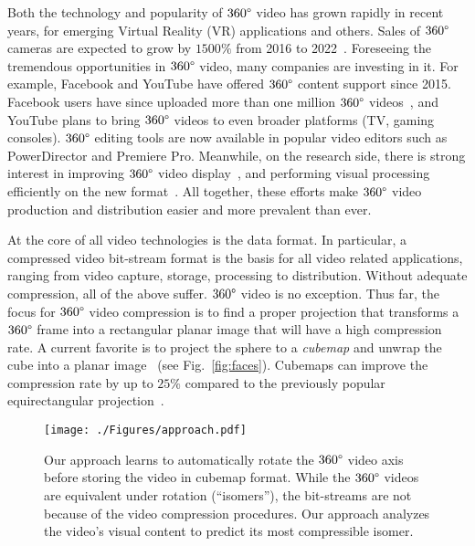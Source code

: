 \documentclass[journal,transmag]{IEEEtran}
\begin{document}
Both the technology and popularity of
$360\degree$ video has grown rapidly in recent years, for emerging Virtual Reality (VR) applications and others.
Sales of $360\degree$ cameras are expected to grow by $1500\%$ from 2016 to 2022~\cite{360camera}.
Foreseeing the tremendous opportunities in $360\degree$ video,
many companies are investing in it.  
For example, Facebook and YouTube have offered $360\degree$ content support since 2015.
Facebook users have since uploaded more than one million $360\degree$ videos~\cite{fb360videostatistics},
and YouTube plans to bring $360\degree$ videos to even broader platforms (TV, gaming consoles).
$360\degree$ editing tools are now available in popular video editors such as PowerDirector and Premiere Pro.
Meanwhile, on the research side, there is strong interest in improving $360\degree$ video display~\cite{kasahara2015first,kopf2016tog,kamali2011stabilizing,su2016accv,su2017cvpr,hu2017deep,lai2017semantic},
and performing visual processing efficiently on the new format~\cite{khasanova2017graph,cohen2017convolutional,su2017nips}.
All together, these efforts make $360\degree$ video production and distribution easier and more prevalent than ever.

At the core of all video technologies is the data format.
In particular, a compressed video bit-stream format is the basis for all video related applications,
ranging from video capture, storage, processing to distribution.
Without adequate compression,
all of the above suffer.  
$360\degree$ video is no exception.
Thus far, the focus for $360\degree$ video compression is to find a proper projection that transforms a $360\degree$ frame into a rectangular planar image that will have a high compression rate.
A current favorite is to project the sphere to a \emph{cubemap} and unwrap the cube into a planar image~\cite{fb2015cubemap,google2017eac,mpeg120} (see Fig.~\ref{fig:faces}).
Cubemaps can improve the compression rate by up to $25\%$ compared to the previously popular equirectangular projection~\cite{fb2016compressionrate}.

\begin{figure}[t]
    \center
    \texttt{[image: ./Figures/approach.pdf]}
    \caption{
        Our approach learns to automatically rotate the $360\degree$ video axis before storing the video in cubemap format.
        While the $360\degree$ videos are equivalent under rotation (``isomers''),
        the bit-streams are not because of the video compression procedures.  Our approach analyzes the video's visual content to predict its most compressible isomer.
        \label{fig:approach}
    }
\end{figure}
\end{document}
